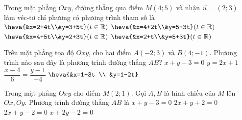 \begin{ex}%
	Trong mặt  phẳng $Oxy$, đường thẳng qua điểm $M(4;5)$ và nhận $\overrightarrow{u}=(2;3)$ làm véc-tơ chỉ phương có phương trình tham số là
	 \choice
		 {$\heva{&x=2+4t\\&y=3+5t} (t \in \mathbb{R})$}
		{\True $\heva{&x=4+2t\\&y=5+3t} (t \in \mathbb{R})$} 
		{$\heva{&x=4+5t\\&y=2+3t} (t \in \mathbb{R})$} 
		{$\heva{&x=2+t\\&y=5+3t} (t \in \mathbb{R})$} 
\end{ex}

\begin{ex}%
	Trên mặt phẳng tọa độ $Oxy$, cho hai điểm $A(-2; 3)$ và $B(4;-1)$. Phương trình nào sau đây  là phương trình đường thẳng $AB$?
	\choice 
		 {$x+y-3=0$}
		{$y=2x+1$} 
		 {$\dfrac{x-4}{6}=\dfrac{y-1}{-4}$}
		{\True $\heva{&x=1+3t \\ 
		&y=1-2t}$} 
\end{ex}

\begin{ex}%
	Trong mặt phẳng $ Oxy $ cho điểm $ M(2;1) $.  Gọi $ A, B $ là hình chiếu của $ M $ lên $ Ox, Oy $.
	Phương trình đường  thẳng $ AB $ là
	 \choice
		{$ x + y - 3  = 0 $}
		{$ 2x + y  + 2 = 0 $}
		 {$ 2x + y - 2 = 0 $}
		{\True $ x + 2y -  2 = 0 $}
\end{ex}

